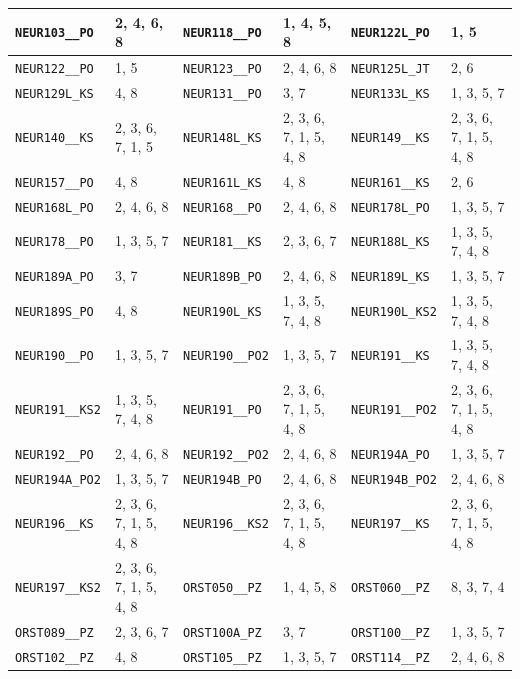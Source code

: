 \begin{longtable}{|l|l||l|l||l|l|}
    \verb|NEUR103__PO| & 2, 4, 6, 8 & \verb|NEUR118__PO| & 1, 4, 5, 8 & \verb|NEUR122L_PO| & 1, 5\\\hline
    \verb|NEUR122__PO| & 1, 5 & \verb|NEUR123__PO| & 2, 4, 6, 8 & \verb|NEUR125L_JT| & 2, 6\\\hline
    \verb|NEUR129L_KS| & 4, 8 & \verb|NEUR131__PO| & 3, 7 & \verb|NEUR133L_KS| & 1, 3, 5, 7\\\hline
    \verb|NEUR140__KS| & 2, 3, 6, 7, 1, 5 & \verb|NEUR148L_KS| & 2, 3, 6, 7, 1, 5, 4, 8 & \verb|NEUR149__KS| & 2, 3, 6, 7, 1, 5, 4, 8\\\hline
    \verb|NEUR157__PO| & 4, 8 & \verb|NEUR161L_KS| & 4, 8 & \verb|NEUR161__KS| & 2, 6\\\hline
    \verb|NEUR168L_PO| & 2, 4, 6, 8 & \verb|NEUR168__PO| & 2, 4, 6, 8 & \verb|NEUR178L_PO| & 1, 3, 5, 7\\\hline
    \verb|NEUR178__PO| & 1, 3, 5, 7 & \verb|NEUR181__KS| & 2, 3, 6, 7 & \verb|NEUR188L_KS| & 1, 3, 5, 7, 4, 8\\\hline
    \verb|NEUR189A_PO| & 3, 7 & \verb|NEUR189B_PO| & 2, 4, 6, 8 & \verb|NEUR189L_KS| & 1, 3, 5, 7\\\hline
    \verb|NEUR189S_PO| & 4, 8 & \verb|NEUR190L_KS| & 1, 3, 5, 7, 4, 8 & \verb|NEUR190L_KS2| & 1, 3, 5, 7, 4, 8\\\hline
    \verb|NEUR190__PO| & 1, 3, 5, 7 & \verb|NEUR190__PO2| & 1, 3, 5, 7 & \verb|NEUR191__KS| & 1, 3, 5, 7, 4, 8\\\hline
    \verb|NEUR191__KS2| & 1, 3, 5, 7, 4, 8 & \verb|NEUR191__PO| & 2, 3, 6, 7, 1, 5, 4, 8 & \verb|NEUR191__PO2| & 2, 3, 6, 7, 1, 5, 4, 8\\\hline
    \verb|NEUR192__PO| & 2, 4, 6, 8 & \verb|NEUR192__PO2| & 2, 4, 6, 8 & \verb|NEUR194A_PO| & 1, 3, 5, 7\\\hline
    \verb|NEUR194A_PO2| & 1, 3, 5, 7 & \verb|NEUR194B_PO| & 2, 4, 6, 8 & \verb|NEUR194B_PO2| & 2, 4, 6, 8\\\hline
    \verb|NEUR196__KS| & 2, 3, 6, 7, 1, 5, 4, 8 & \verb|NEUR196__KS2| & 2, 3, 6, 7, 1, 5, 4, 8 & \verb|NEUR197__KS| & 2, 3, 6, 7, 1, 5, 4, 8\\\hline
    \verb|NEUR197__KS2| & 2, 3, 6, 7, 1, 5, 4, 8 & \verb|ORST050__PZ| & 1, 4, 5, 8 & \verb|ORST060__PZ| & 8, 3, 7, 4\\\hline
    \verb|ORST089__PZ| & 2, 3, 6, 7 & \verb|ORST100A_PZ| & 3, 7 & \verb|ORST100__PZ| & 1, 3, 5, 7\\\hline
    \verb|ORST102__PZ| & 4, 8 & \verb|ORST105__PZ| & 1, 3, 5, 7 & \verb|ORST114__PZ| & 2, 4, 6, 8\\\hline

\end{longtable}
